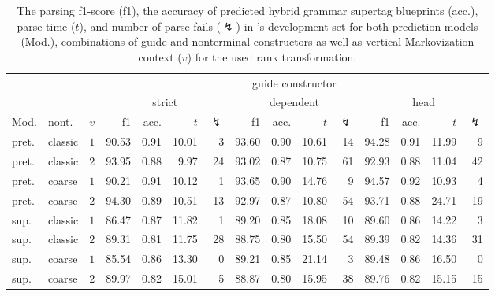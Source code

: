 \documentclass[../../document.tex]{subfiles}
\begin{document}
    \begin{table}
        \caption{\label{tbl:experiments:dptb}
        The parsing f1-score (f1), the accuracy of predicted hybrid grammar supertag blueprints (acc.), parse time ($t$), and number of parse fails ($\lightning$) in 's development set for both prediction models (Mod.), combinations of guide and nonterminal constructors as well as vertical Markovization context ($v$) for the used rank transformation.
        }
        \centering
        \setlength{\tabcolsep}{4pt}
        \vspace{.2cm}
        \begin{tabular}{llc|rrrr|rrrr|rrrr}
            \toprule
            &&& \multicolumn{12}{c}{guide constructor}\\
  &             &        & \multicolumn{4}{c|}{strict} & \multicolumn{4}{c|}{dependent} & \multicolumn{4}{c}{head}  \\
Mod. &     nont.   &\(v\)   & f1 & acc. & $t$ & $\lightning$ & f1 & acc. & $t$ & $\lightning$ & f1 & acc. & $t$ & $\lightning$ \\ \hline
pret. &     classic & \(1\)  & 90.53 & 0.91 & 10.01 & 3 & 93.60 & 0.90 & 10.61 & 14 & 94.28 & 0.91 & 11.99 & 9 \\
pret. &     classic & \(2\)  & 93.95 & 0.88 & 9.97 & 24 & 93.02 & 0.87 & 10.75 & 61 & 92.93 & 0.88 & 11.04 & 42 \\
pret. &     coarse  & \(1\)  & 90.21 & 0.91 & 10.12 & 1 & 93.65 & 0.90 & 14.76 & 9 & 94.57 & 0.92 & 10.93 & 4 \\
pret. &     coarse  & \(2\)  & 94.30 & 0.89 & 10.51 & 13 & 92.97 & 0.87 & 10.80 & 54 & 93.71 & 0.88 & 24.71 & 19 \\
\midrule
sup. & classic & \(1\)  & 86.47 & 0.87 & 11.82 & 1 & 89.20 & 0.85 & 18.08 & 10 & 89.60 & 0.86 & 14.22 & 3 \\
sup. & classic & \(2\)  & 89.31 & 0.81 & 11.75 & 28 & 88.75 & 0.80 & 15.50 & 54 & 89.39 & 0.82 & 14.36 & 31 \\
sup. & coarse  & \(1\)  & 85.54 & 0.86 & 13.30 & 0 & 89.21 & 0.85 & 21.14 & 3 & 89.48 & 0.86 & 16.50 & 0 \\
sup. & coarse  & \(2\)  & 89.97 & 0.82 & 15.01 & 5 & 88.87 & 0.80 & 15.95 & 38 & 89.76 & 0.82 & 15.15 & 15 \\
    \bottomrule
        \end{tabular}
    \end{table}
\end{document}
